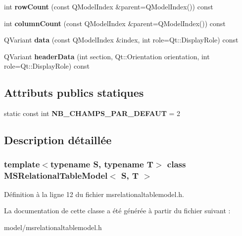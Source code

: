 \begin{DoxyCompactItemize}
\item 
\hypertarget{class_m_s_relational_table_model_af5595dbe07ba68a5828f171111cdf2d1}{
int {\bfseries rowCount} (const QModelIndex \&parent=QModelIndex()) const }
\label{d4/d40/class_m_s_relational_table_model_af5595dbe07ba68a5828f171111cdf2d1}

\item 
\hypertarget{class_m_s_relational_table_model_a5d37089874a8e6f8cd2a3c1cab025e13}{
int {\bfseries columnCount} (const QModelIndex \&parent=QModelIndex()) const }
\label{d4/d40/class_m_s_relational_table_model_a5d37089874a8e6f8cd2a3c1cab025e13}

\item 
\hypertarget{class_m_s_relational_table_model_a2270ae1330105c3b514a474c287b9bbb}{
QVariant {\bfseries data} (const QModelIndex \&index, int role=Qt::DisplayRole) const }
\label{d4/d40/class_m_s_relational_table_model_a2270ae1330105c3b514a474c287b9bbb}

\item 
\hypertarget{class_m_s_relational_table_model_a1e546f090a9e1148a25fdc1168d7169b}{
QVariant {\bfseries headerData} (int section, Qt::Orientation orientation, int role=Qt::DisplayRole) const }
\label{d4/d40/class_m_s_relational_table_model_a1e546f090a9e1148a25fdc1168d7169b}

\end{DoxyCompactItemize}
\subsection*{Attributs publics statiques}
\begin{DoxyCompactItemize}
\item 
\hypertarget{class_m_s_relational_table_model_a97fb315a0bf3ed288aca077576ab16f6}{
static const int {\bfseries NB\_\-CHAMPS\_\-PAR\_\-DEFAUT} = 2}
\label{d4/d40/class_m_s_relational_table_model_a97fb315a0bf3ed288aca077576ab16f6}

\end{DoxyCompactItemize}


\subsection{Description détaillée}
\subsubsection*{template$<$typename S, typename T$>$ class MSRelationalTableModel$<$ S, T $>$}



Définition à la ligne 12 du fichier msrelationaltablemodel.h.



La documentation de cette classe a été générée à partir du fichier suivant :\begin{DoxyCompactItemize}
\item 
model/msrelationaltablemodel.h\end{DoxyCompactItemize}
